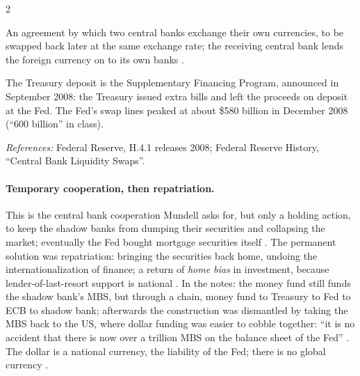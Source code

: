 \begin{paracol}{2}
\begin{nfigure}
\begin{taccts}
\quad
{}\quad
{}
\end{taccts}
\begin{taccts}
\quad
{}
\end{taccts}
\caption{The central bank liquidity swap in the crisis, as drawn in class (changes only) .}\label{fig:intl-swap}
\end{nfigure}

\begin{definition}
An agreement by which two central banks exchange their own currencies, to be swapped back later at the same exchange rate; the receiving central bank lends the
foreign currency on to its own banks .
\end{definition}

\begin{coursenote}
The Treasury deposit is the Supplementary Financing Program, announced in September 2008: the Treasury issued extra bills and left the proceeds on deposit at the
Fed. The Fed's swap lines peaked at about \$580 billion in December 2008 (``600 billion'' in class).\par
\emph{References:} Federal Reserve, H.4.1 releases 2008; Federal Reserve History, ``Central Bank Liquidity Swaps''.
\end{coursenote}

\paragraph{Temporary cooperation, then repatriation.} This is the central bank cooperation Mundell asks for, but only a holding action, to keep the shadow banks from
dumping their securities and collapsing the market; eventually the Fed bought mortgage securities itself . The
permanent solution was repatriation: bringing the securities back home, undoing the internationalization of finance; a return of \emph{home bias} in
investment, because lender-of-last-resort support is national . In the notes: the money fund still funds the shadow bank's MBS, but through a chain, money fund to
Treasury to Fed to ECB to shadow bank; afterwards the construction was dismantled by taking the MBS back to the US, where dollar funding was easier to cobble together: ``it is no accident
that there is now over a trillion MBS on the balance sheet of the Fed'' . The dollar is a national currency,
the liability of the Fed; there is no global currency .


\end{paracol}
